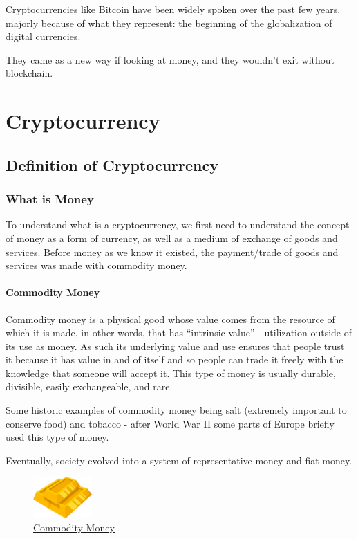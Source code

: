 \documentclass{article}
\newcommand\tab[1][1cm]{\hspace*{#1}}
\begin{document}
\tab Cryptocurrencies like Bitcoin have been widely spoken over the past few years, majorly because of what they represent: the beginning of the globalization of digital currencies.

They came as a new way if looking at money, and they wouldn't exit without blockchain.

\section{Cryptocurrency}

\subsection{Definition of Cryptocurrency}

\subsubsection{What is Money}

\tab To understand what is a cryptocurrency, we first need to understand the concept of money as a form of currency, as well as a medium of exchange of goods and services. Before money as we know it existed, the payment/trade of goods and services was made with commodity money.

\paragraph{Commodity Money}
 
\tab Commodity money is a physical good whose value comes from the resource of which it is made, in other words, that has “intrinsic value” - utilization outside of its use as money. As such its underlying value and use ensures that people trust it because it has value in and of itself and so people can trade it freely with the knowledge that someone will accept it. This type of money is usually durable, divisible, easily exchangeable, and rare.

Some historic examples of commodity money being salt (extremely important to conserve food) and tobacco - after World War II some parts of Europe briefly used this type of money.

Eventually, society evolved into a system of representative money and fiat money.

\begin{figure}[H]
    \begin{center}
        \includegraphics[width=0.2\textwidth]{images/gold.png}
        \caption{\href{https://creazilla-store.fra1.digitaloceanspaces.com/cliparts/60810/gold-bars-clipart-md.png}{\underline{Commodity Money}}}
    \end{center}
\end{figure}
\end{document}
